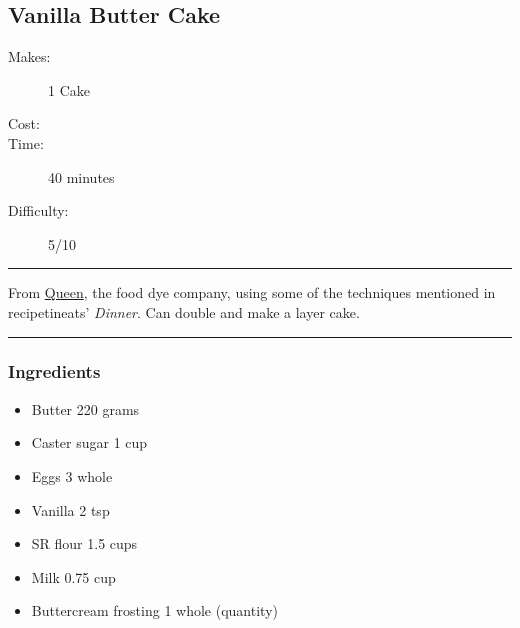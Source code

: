 \documentclass[]{article}
\begin{document}
\subsection*{\center\huge Vanilla Butter Cake}
\begin{description}
\item[Makes:] 1 Cake
\item[Cost:] \textdollar
\item[Time:] 40 minutes
\item[Difficulty:] 5/10
\end{description}
\vspace{0.2cm}\hrule\vspace{0.5cm}
\begin{adjustwidth}{0.5 cm}{0.5 cm}

From \href{https://queen.com.au/recipes/perfect-vanilla-butter-cake/}{Queen}, the food dye company, using some of the techniques mentioned in recipetineats' \textit{Dinner}. Can double and make a layer cake. \hfill{}\color{black}

\end{adjustwidth}
\vspace{0.5cm}\hrule
\subsubsection*{\Large Ingredients}
\begin{multicols}{2}
\begin{itemize}
 \item Butter \hfill 220 grams
 \item Caster sugar \hfill 1 cup
 \item Eggs \hfill 3 whole
 \item Vanilla \hfill 2 tsp
 \item SR flour \hfill 1.5 cups
 \item Milk \hfill 0.75 cup
 \item Buttercream frosting \hfill 1 whole (quantity)
\end{itemize}
\end{multicols}
\end{document}
